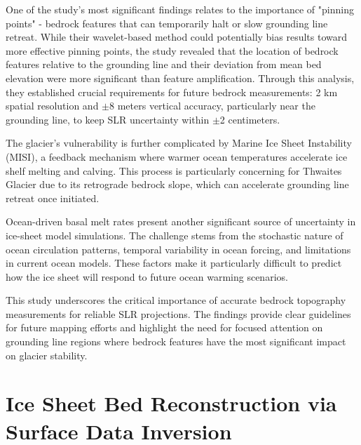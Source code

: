One of the study's most significant findings relates to the importance of "pinning points" - bedrock features that can temporarily halt or slow grounding line retreat. While their wavelet-based method could potentially bias results toward more effective pinning points, the study revealed that the location of bedrock features relative to the grounding line and their deviation from mean bed elevation were more significant than feature amplification\cite{Castleman_2022}. Through this analysis, they established crucial requirements for future bedrock measurements: 2 km spatial resolution and $\pm$8 meters vertical accuracy, particularly near the grounding line, to keep SLR uncertainty within $\pm$2 centimeters.

The glacier's vulnerability is further complicated by Marine Ice Sheet Instability (MISI)\cite{Castleman_2022}, a feedback mechanism where warmer ocean temperatures accelerate ice shelf melting and calving. This process is particularly concerning for Thwaites Glacier due to its retrograde bedrock slope\cite{Castleman_2022}, which can accelerate grounding line retreat once initiated.

Ocean-driven basal melt rates present another significant source of uncertainty in ice-sheet model simulations. The challenge stems from the stochastic nature of ocean circulation patterns, temporal variability in ocean forcing, and limitations in current ocean models\cite{Castleman_2022}. These factors make it particularly difficult to predict how the ice sheet will respond to future ocean warming scenarios\cite{Castleman_2022}.

This study underscores the critical importance of accurate bedrock topography measurements for reliable SLR projections. The findings provide clear guidelines for future mapping efforts and highlight the need for focused attention on grounding line regions where bedrock features have the most significant impact on glacier stability.

\section*{Ice Sheet Bed Reconstruction via  Surface Data Inversion} %

